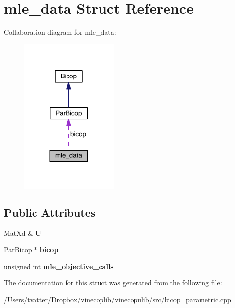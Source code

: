 \hypertarget{structmle__data}{}\section{mle\+\_\+data Struct Reference}
\label{structmle__data}


Collaboration diagram for mle\+\_\+data\+:
\nopagebreak
\begin{figure}[H]
\begin{center}
\leavevmode
\includegraphics[width=137pt]{structmle__data__coll__graph}
\end{center}
\end{figure}
\subsection*{Public Attributes}
\begin{DoxyCompactItemize}
\item 
\mbox{\label{structmle__data_a2e852ebb2035c14fc72b5b15569c5341}} 
Mat\+Xd \& {\bfseries U}
\item 
\mbox{\label{structmle__data_ae04dba422cd664ab96e5ec0a03ff1467}} 
\hyperlink{class_par_bicop}{Par\+Bicop} $\ast$ {\bfseries bicop}
\item 
\mbox{\label{structmle__data_af569e2780d562a963f33b111c99b9e27}} 
unsigned int {\bfseries mle\+\_\+objective\+\_\+calls}
\end{DoxyCompactItemize}


The documentation for this struct was generated from the following file\+:\begin{DoxyCompactItemize}
\item 
/\+Users/tvatter/\+Dropbox/vinecoplib/vinecopulib/src/bicop\+\_\+parametric.\+cpp\end{DoxyCompactItemize}
